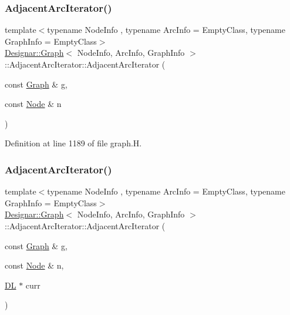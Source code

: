 \subsubsection{\texorpdfstring{Adjacent\+Arc\+Iterator()}{AdjacentArcIterator()}\hspace{0.1cm}{\footnotesize\ttfamily [2/5]}}
{\footnotesize\ttfamily template$<$typename Node\+Info , typename Arc\+Info  = Empty\+Class, typename Graph\+Info  = Empty\+Class$>$ \\
\hyperlink{class_designar_1_1_graph}{Designar\+::\+Graph}$<$ Node\+Info, Arc\+Info, Graph\+Info $>$\+::Adjacent\+Arc\+Iterator\+::\+Adjacent\+Arc\+Iterator (\begin{DoxyParamCaption}\item[{const \hyperlink{class_designar_1_1_graph}{Graph} \&}]{g,  }\item[{const \hyperlink{class_designar_1_1_graph_a5dfc7dba9d092ac489c72e40390c37d0}{Node} \&}]{n }\end{DoxyParamCaption})\hspace{0.3cm}{\ttfamily [inline]}}



Definition at line 1189 of file graph.\+H.

\mbox{\label{class_designar_1_1_graph_1_1_adjacent_arc_iterator_a97e3e5909f6e9b9b6b55cbc0fb2d5263}} 
\subsubsection{\texorpdfstring{Adjacent\+Arc\+Iterator()}{AdjacentArcIterator()}\hspace{0.1cm}{\footnotesize\ttfamily [3/5]}}
{\footnotesize\ttfamily template$<$typename Node\+Info , typename Arc\+Info  = Empty\+Class, typename Graph\+Info  = Empty\+Class$>$ \\
\hyperlink{class_designar_1_1_graph}{Designar\+::\+Graph}$<$ Node\+Info, Arc\+Info, Graph\+Info $>$\+::Adjacent\+Arc\+Iterator\+::\+Adjacent\+Arc\+Iterator (\begin{DoxyParamCaption}\item[{const \hyperlink{class_designar_1_1_graph}{Graph} \&}]{g,  }\item[{const \hyperlink{class_designar_1_1_graph_a5dfc7dba9d092ac489c72e40390c37d0}{Node} \&}]{n,  }\item[{\hyperlink{class_designar_1_1_d_l}{DL} $\ast$}]{curr }\end{DoxyParamCaption})\hspace{0.3cm}{\ttfamily [inline]}}



